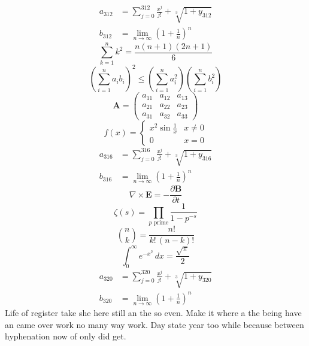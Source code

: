 \documentclass[11pt]{article}
\begin{document}
\begin{align}
  a_{312} &= \sum_{j=0}^{312} \frac{x^j}{j!} + \sqrt[3]{1+y_{312}} \\
  b_{312} &= \lim_{n\to\infty} \left(1+\frac{1}{n}\right)^{n}
\end{align}
\begin{equation}
\sum_{k=1}^{n} k^2 = \frac{n(n+1)(2n+1)}{6}
\end{equation}
\begin{equation}
\left( \sum_{i=1}^n a_i b_i \right)^2 \le \left(\sum_{i=1}^n a_i^2\right)\left(\sum_{i=1}^n b_i^2\right)
\end{equation}
\begin{equation}
\mathbf{A} = \begin{pmatrix} a_{11} & a_{12} & a_{13} \\ a_{21} & a_{22} & a_{23} \\ a_{31} & a_{32} & a_{33} \end{pmatrix}
\end{equation}
\begin{equation}
f(x) = \begin{cases} x^2 \sin\frac{1}{x} & x \ne 0 \\ 0 & x = 0 \end{cases}
\end{equation}
\begin{align}
  a_{316} &= \sum_{j=0}^{316} \frac{x^j}{j!} + \sqrt[3]{1+y_{316}} \\
  b_{316} &= \lim_{n\to\infty} \left(1+\frac{1}{n}\right)^{n}
\end{align}
\begin{equation}
\nabla \times \mathbf{E} = -\frac{\partial \mathbf{B}}{\partial t}
\end{equation}
\begin{equation}
\zeta(s) = \prod_{p \text{ prime}} \frac{1}{1 - p^{-s}}
\end{equation}
\begin{equation}
\binom{n}{k} = \frac{n!}{k!\,(n-k)!}
\end{equation}
\begin{equation}
\int_0^\infty e^{-x^2}\,dx = \frac{\sqrt{\pi}}{2}
\end{equation}
\begin{align}
  a_{320} &= \sum_{j=0}^{320} \frac{x^j}{j!} + \sqrt[3]{1+y_{320}} \\
  b_{320} &= \lim_{n\to\infty} \left(1+\frac{1}{n}\right)^{n}
\end{align}
Life of register take she here still an the so even. Make it where a the being have an came over work no many way work. Day state year too while because between hyphenation now of only did get.
\end{document}
